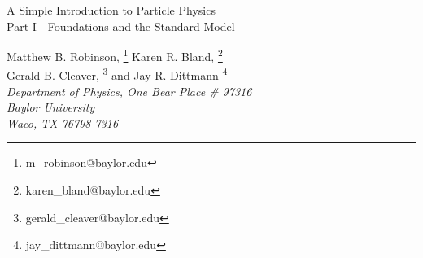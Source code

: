 \documentclass[12pt,epsf]{article}
\renewcommand{\thefootnote}{\fnsymbol{footnote}}
\begin{document}
\renewcommand{\thefootnote}{\arabic{footnote}}

\begin{titlepage}
\setcounter{page}{1}
\rightline{\tt }

\vspace{.06in}
\begin{center}
{\Large A Simple Introduction to Particle Physics \\
\rm \large Part I - Foundations and the Standard Model}\\
\vspace{.12in}

{\large
        Matthew B. Robinson, \footnote{m\_robinson@baylor.edu}
        Karen R. Bland, \footnote{karen\_bland@baylor.edu} \\
        Gerald B. Cleaver, \footnote{gerald\_cleaver@baylor.edu} and
        Jay R. Dittmann \footnote{jay\_dittmann@baylor.edu}}
\\
\vspace{.12in}
{\it        Department of Physics, One Bear Place \# 97316\\
            Baylor University\\
            Waco, TX 76798-7316\\}
\vspace{.06in}
\end{center}

\begin{abstract}

\addtolength{\parskip}{0.8\baselineskip}
\parindent 0pt

\noindent This is the first of a series of papers in which we present a brief
introduction to the relevant mathematical and physical ideas that form
the foundation of Particle Physics, including Group Theory,
Relativistic Quantum Mechanics, Quantum Field Theory and Interactions,
Abelian and Non-Abelian Gauge Theory, and the $SU(3)\otimes SU(2)
\otimes U(1)$ Gauge Theory that describes our universe apart from
gravity.  Our approach, at first, is an algebraic exposition of Gauge
Theory and how the physics of our universe comes out of Gauge Theory.  

With an algebraic understanding of Gauge Theory and the relevant
physics of the Standard Model from this paper, in a subsequent paper we
will ``back up" and reformulate Gauge Theory from a geometric
foundation, showing how it connects to the algebraic picture initially
built in these notes.  

Finally, we will introduce the basic ideas of String Theory, showing
both the geometric and algebraic correspondence with Gauge Theory as
outlined in the first two parts.  


\end{abstract}
\end{titlepage}
\end{document}
